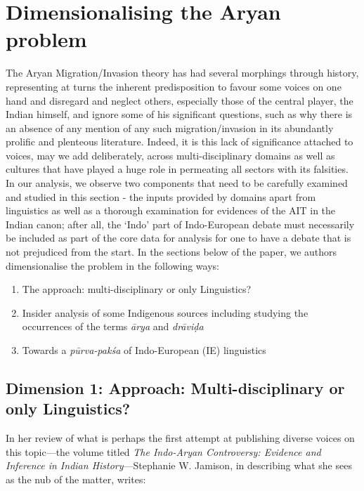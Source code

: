 \section{Dimensionalising the Aryan problem}

The Aryan Migration/Invasion theory has had several morphings through history, representing at turns the inherent predisposition to favour some voices on one hand and disregard and neglect others, especially those of the central player, the Indian himself, and ignore some of his significant questions, such as why there is an absence of any mention of any such migration/invasion in its abundantly prolific and plenteous literature. Indeed, it is this lack of significance attached to voices, may we add deliberately, across multi-disciplinary domains as well as cultures that have played a huge role in permeating all sectors with its falsities. In our analysis, we observe two components that need to be carefully examined and studied in this section - the inputs provided by domains apart from linguistics as well as a thorough examination for evidences of the AIT in the Indian canon; after all, the ‘Indo’ part of Indo-European debate must necessarily be included as part of the core data for analysis for one to have a debate that is not prejudiced from the start. In the sections below of the paper, we authors dimensionalise the problem in the following ways:

\begin{enumerate}
\item The approach: multi-disciplinary or only Linguistics?

 \item Insider analysis of some Indigenous sources including studying the occurrences of the terms \textit{ārya} and \textit{drāviḍa}

 \item Towards a \textit{pūrva-pakśa} of Indo-European (IE) linguistics

\end{enumerate}


\subsection{Dimension 1: Approach: Multi-disciplinary or only Linguistics?}

In her review of what is perhaps the first attempt at publishing diverse voices on this topic—the volume titled \textit{The Indo-Aryan Controversy: Evidence and Inference in Indian History}—Stephanie W. Jamison, in describing what she sees as the nub of the matter, writes:

